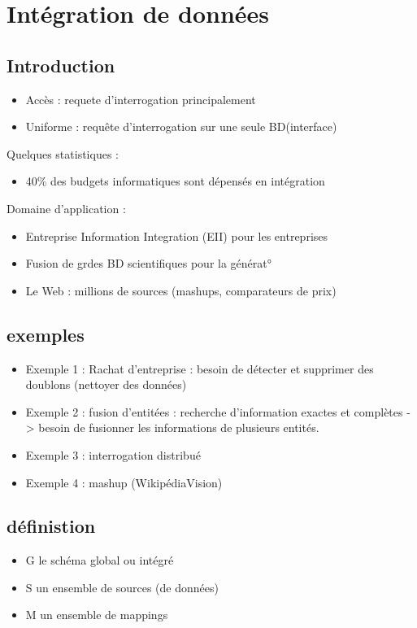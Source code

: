 
\section{Intégration de données}


\subsection{Introduction}

\begin{itemize}
\item Accès : requete d'interrogation principalement
\item Uniforme : requête d'interrogation sur une seule BD(interface)
\end{itemize}


Quelques statistiques :
\begin{itemize}
\item 40\% des budgets informatiques sont dépensés en intégration
\end{itemize}

Domaine d'application :
\begin{itemize}
\item Entreprise Information Integration (EII) pour les entreprises
\item Fusion de grdes BD scientifiques pour la générat°
\item Le Web : millions de sources (mashups, comparateurs de prix)
\end{itemize}

\subsection{exemples}
\begin{itemize}
\item Exemple 1 : Rachat d'entreprise : besoin de détecter et supprimer des doublons (nettoyer des données)
\item Exemple 2 : fusion d'entitées : recherche d'information exactes et complètes -> besoin de fusionner les informations de plusieurs entités.
\item Exemple 3 : interrogation distribué
\item Exemple 4 : mashup (WikipédiaVision)
\end{itemize}

\subsection{définistion}
\begin{itemize}
\item G le schéma global ou intégré
\item S un ensemble de sources (de données)
\item M un ensemble de mappings
\end{itemize}

